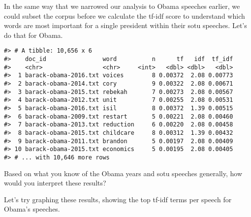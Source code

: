 \documentclass[]{book}
\newenvironment{Shaded}{\begin{snugshade}}{\end{snugshade}}
\newcommand{\DataTypeTok}[1]{\textcolor[rgb]{0.13,0.29,0.53}{#1}}
\newcommand{\KeywordTok}[1]{\textcolor[rgb]{0.13,0.29,0.53}{\textbf{#1}}}
\newcommand{\NormalTok}[1]{#1}
\newcommand{\OperatorTok}[1]{\textcolor[rgb]{0.81,0.36,0.00}{\textbf{#1}}}
\newcommand{\OtherTok}[1]{\textcolor[rgb]{0.56,0.35,0.01}{#1}}
\newcommand{\StringTok}[1]{\textcolor[rgb]{0.31,0.60,0.02}{#1}}
\begin{document}
In the same way that we narrowed our analysis to Obama speeches earlier, we could subset the corpus before we calculate the tf-idf score to understand which words are most important for a single president within their sotu speeches. Let's do that for Obama.

\begin{Shaded}
\end{Shaded}

\begin{verbatim}
#> # A tibble: 10,656 x 6
#>    doc_id                word          n      tf   idf  tf_idf
#>    <chr>                 <chr>     <int>   <dbl> <dbl>   <dbl>
#>  1 barack-obama-2016.txt voices        8 0.00372  2.08 0.00773
#>  2 barack-obama-2014.txt cory          9 0.00322  2.08 0.00671
#>  3 barack-obama-2015.txt rebekah       7 0.00273  2.08 0.00567
#>  4 barack-obama-2012.txt unit          7 0.00255  2.08 0.00531
#>  5 barack-obama-2016.txt isil          8 0.00372  1.39 0.00515
#>  6 barack-obama-2009.txt restart       5 0.00221  2.08 0.00460
#>  7 barack-obama-2013.txt reduction     6 0.00220  2.08 0.00458
#>  8 barack-obama-2015.txt childcare     8 0.00312  1.39 0.00432
#>  9 barack-obama-2011.txt brandon       5 0.00197  2.08 0.00409
#> 10 barack-obama-2015.txt economics     5 0.00195  2.08 0.00405
#> # ... with 10,646 more rows
\end{verbatim}

Based on what you know of the Obama years and sotu speeches generally, how would you interpret these results?

Let's try graphing these results, showing the top tf-idf terms per speech for Obama's speeches.
\end{document}
